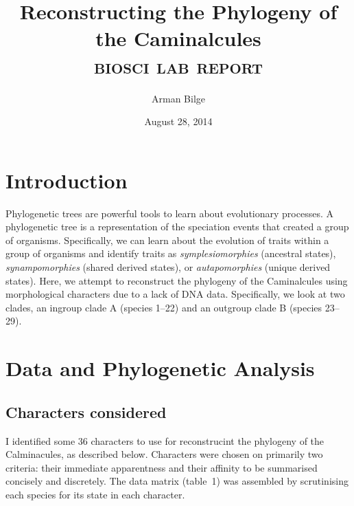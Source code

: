 \documentclass{article}
\title{Reconstructing the Phylogeny of the Caminalcules \\
       \Large\textsc{biosci \oldstylenums{210} lab report}}
\author{Arman Bilge}
\date{August 28, 2014}
\begin{document}
    \maketitle

    \section*{Introduction}

        Phylogenetic trees are powerful tools to learn about evolutionary
            processes.
        A phylogenetic tree is a representation of the speciation events that
            created a group of organisms.
        Specifically, we can learn about the evolution of traits within a group of organisms and identify traits as \emph{symplesiomorphies} (ancestral states), \emph{synampomorphies} (shared derived states), or \emph{autapomorphies} (unique derived states).
        Here, we attempt to reconstruct the phylogeny of the Caminalcules using
            morphological characters due to a lack of DNA data.
        Specifically, we look at two clades, an ingroup clade A (species 1--22) and an outgroup clade B (species 23--29).

    \section*{Data and Phylogenetic Analysis}

        \subsection*{Characters considered}

            I identified some 36 characters to use for reconstrucint the phylogeny of the Calminacules, as described below.
            Characters were chosen on primarily two criteria: their immediate apparentness and their affinity to be summarised concisely and discretely.
            The data matrix (table~1) was assembled by scrutinising each species for its state in each character.
\end{document}
